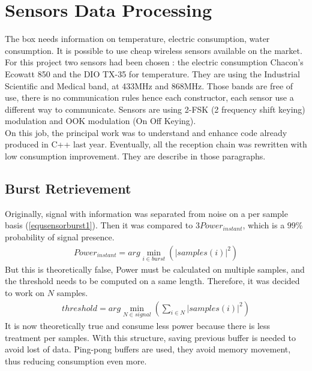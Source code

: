 %
%
\section{Sensors Data Processing}
The box needs information on temperature, electric consumption, water consumption. It is possible to use cheap wireless sensors available on the market. For this project two sensors had been chosen : the electric consumption Chacon's Ecowatt 850 and the DIO TX-35 for temperature. They are using the Industrial Scientific and Medical band, at 433MHz and 868MHz. Those bands are free of use, there is no communication rules hence each constructor, each sensor use a different way to communicate. Sensors are using 2-FSK (2 frequency shift keying) modulation and OOK modulation (On Off Keying). \\
On this job, the principal work was to understand and enhance code already produced in \textsc{C++} last year. Eventually, all the reception chain was rewritten with low consumption improvement. They are describe in those paragraphs.

\subsection{Burst Retrievement}
Originally, signal with information was separated from noise on a per sample basis (\ref{equsensorburst1}). Then it was compared to $3Power_{instant}$, which is a $99\%$ probability of signal presence.
\vspace{-7pt}
\begin{align} \label{equsensorburst1}
Power_{instant} = arg\min_{i\in burst}(|samples(i)|^2)
\end{align}
But this is theoretically false, Power must be calculated on multiple samples, and the threshold needs to be computed on a same length. Therefore, it was decided to work on $N$ samples.
\begin{align} \label{equsensorburst2}
threshold = arg\min_{N \in signal}\left(\sum_{i\in N}|samples(i)|^2\right)
\end{align}
It is now theoretically true and consume less power because there is less treatment per samples. With this structure, saving previous buffer is needed to avoid lost of data. Ping-pong buffers are used, they avoid memory movement, thus reducing consumption even more.

